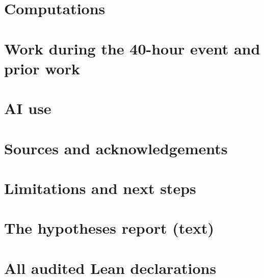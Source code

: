\documentclass[11pt]{article}
\numberwithin{equation}{section}
\begin{document}
\section{Computations}\label{sec:comp}




\section{Work during the 40-hour event and prior work}\label{sec:event}


\section{AI use}\label{sec:ai}




\section{Sources and acknowledgements}\label{sec:sources}


\section{Limitations and next steps}\label{sec:limits}




{\sloppy

}

\appendix
\section{The hypotheses report (text)}\label{app:hyp}


\section{All audited Lean declarations}\label{app:decls}



\end{document}
